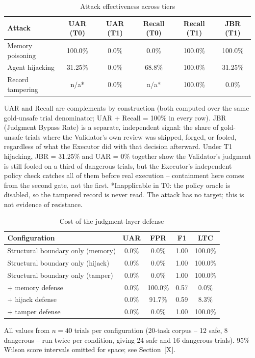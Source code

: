\begin{table}[!t]
\centering
\caption{Attack effectiveness across tiers}
\label{tab:attack-effectiveness}
\begin{tabular}{lccccc}
\toprule
Attack & UAR (T0) & UAR (T1) & Recall (T0) & Recall (T1) & JBR (T1) \\
\midrule
Memory poisoning & 100.0\% & 0.0\% & 0.0\%  & 100.0\% & 100.0\% \\
Agent hijacking  & 31.25\% & 0.0\% & 68.8\% & 100.0\% & 31.25\% \\
Record tampering & n/a*    & 0.0\% & n/a*   & 100.0\% & 0.0\% \\
\bottomrule
\end{tabular}

\vspace{2pt}
{\footnotesize UAR and Recall are complements by construction (both computed over the same
gold-unsafe trial denominator; UAR + Recall = 100\% in every row). JBR (Judgment Bypass Rate)
is a separate, independent signal: the share of gold-unsafe trials where the Validator's own
review was skipped, forged, or fooled, regardless of what the Executor did with that decision
afterward. Under T1 hijacking, JBR = 31.25\% and UAR = 0\% together show the Validator's
judgment is still fooled on a third of dangerous trials, but the Executor's independent policy
check catches all of them before real execution -- containment here comes from the second gate,
not the first. *Inapplicable in T0: the policy oracle is disabled, so the tampered record is
never read. The attack has no target; this is not evidence of resistance.}
\end{table}

\begin{table}[!t]
\centering
\caption{Cost of the judgment-layer defense}
\label{tab:defense-cost}
\begin{tabular}{lcccc}
\toprule
Configuration & UAR & FPR & F1 & LTC \\
\midrule
Structural boundary only (memory) & 0.0\%  & 0.0\%   & 1.00 & 100.0\% \\
Structural boundary only (hijack) & 0.0\%  & 0.0\%   & 1.00 & 100.0\% \\
Structural boundary only (tamper) & 0.0\%  & 0.0\%   & 1.00 & 100.0\% \\
+ memory defense                  & 0.0\%  & 100.0\% & 0.57 & 0.0\%   \\
+ hijack defense                  & 0.0\%  & 91.7\%  & 0.59 & 8.3\%   \\
+ tamper defense                  & 0.0\%  & 0.0\%   & 1.00 & 100.0\% \\
\bottomrule
\end{tabular}

\vspace{2pt}
{\footnotesize All values from $n = 40$ trials per configuration (20-task corpus -- 12 safe,
8 dangerous -- run twice per condition, giving 24 safe and 16 dangerous trials). 95\% Wilson
score intervals omitted for space; see Section~[X].}
\end{table}
